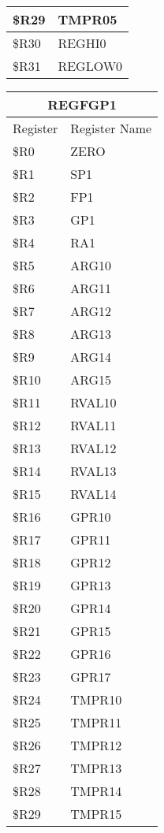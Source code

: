 \documentclass[letterpaper, 11pt]{article}
\begin{document}
\begin{figure}[!h]
{\begin{tabular}{|l|l|}
				\$R29 & TMPR05  \\ \hline
				\$R30 & REGHI0  \\ \hline
				\$R31 & REGLOW0  \\ \hline
			\end{tabular}
		}
		\hfill
		\parbox{0.2\linewidth}{
			\centering
			\fontsize{6}{8}\selectfont
			\begin{tabular}{|l|l|}
				\hline
				\multicolumn{2}{|c|}{REGFGP1} \\
				\hline
				Register & Register Name \\ \hline
				\$R0  & ZERO \\ 	\hline
				\$R1  & SP1 \\ 	\hline
				\$R2  & FP1 \\ 	\hline
				\$R3  & GP1 \\ 	\hline
				\$R4  & RA1 \\ 	\hline
				\$R5  & ARG10 \\ 	\hline
				\$R6  & ARG11 \\ 	\hline
				\$R7  & ARG12 \\ 	\hline
				\$R8  & ARG13 \\ 	\hline
				\$R9  & ARG14 \\ 	\hline
				\$R10 & ARG15 \\ \hline
				\$R11 & RVAL10  \\ \hline
				\$R12 & RVAL11  \\ \hline
				\$R13 & RVAL12  \\ \hline
				\$R14 & RVAL13  \\ \hline
				\$R15 & RVAL14  \\ \hline
				\$R16 & GPR10  \\ \hline
				\$R17 & GPR11  \\ \hline
				\$R18 & GPR12  \\ \hline
				\$R19 & GPR13  \\ \hline
				\$R20 & GPR14  \\ \hline
				\$R21 & GPR15  \\ \hline
				\$R22 & GPR16  \\ \hline
				\$R23 & GPR17  \\ \hline
				\$R24 & TMPR10  \\ \hline
				\$R25 & TMPR11  \\ \hline
				\$R26 & TMPR12  \\ \hline
				\$R27 & TMPR13  \\ \hline
				\$R28 & TMPR14  \\ \hline
				\$R29 & TMPR15  \\ \hline

\end{tabular}}
\end{figure}
\end{document}
